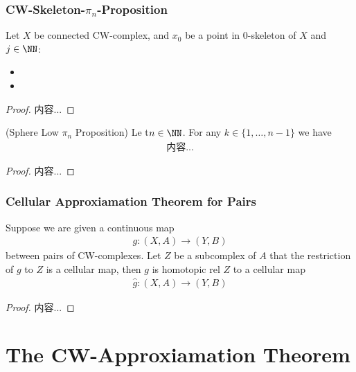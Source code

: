 \documentclass[Total.tex]{subfiles}
\begin{document}
	\subsubsection{CW-Skeleton-$\pi_n$-Proposition}
	\begin{proposition}
		Let $X$ be connected CW-complex, and $x_0$ be a point in $0$-skeleton of $X$ and $j\in \NN$:
		\begin{itemize}
			\item 
			\item 
		\end{itemize}
	\end{proposition}
	\begin{proof}
		内容...
	\end{proof}
	
	\begin{proposition}
		(Sphere Low $\pi_n$ Proposition) Le t$n\in \NN$. For any $k\in \{1,\dots,n-1\}$ we have
		\begin{gather*}
			内容...
		\end{gather*}
	\end{proposition}
	\begin{proof}
		内容...
	\end{proof}
	\subsubsection{Cellular Approxiamation Theorem for Pairs}
	\begin{theorem}
		Suppose we are given a continuous map
		\begin{gather*}
			g:(X,A)\rightarrow (Y,B)
		\end{gather*}
		between pairs of CW-complexes. Let $Z$ be a subcomplex of $A$ that the restriction of $g$ to $Z$ is a cellular map, then $g$ is homotopic rel $Z$ to a cellular map
		\begin{gather*}
			\hat{g}:(X,A)\rightarrow (Y,B)
		\end{gather*}
	\end{theorem}
	\begin{proof}
		内容...
	\end{proof}
	\section{The CW-Approxiamation Theorem}
\end{document}

